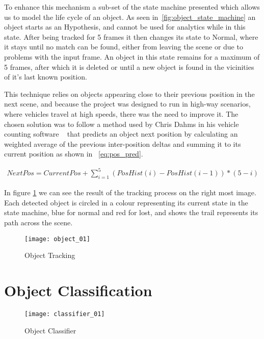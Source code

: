 To enhance this mechanism a sub-set of the state machine presented  which allows us to model the life cycle of an object. As seen in~\ref{fig:object_state_machine} an object starts as an Hypothesis, and cannot be used for analytics while in this state. After being tracked for 5 frames it then changes its state to Normal, where it stays until no match can be found, either from leaving the scene or due to problems with the input frame. An object in this state remains for a maximum of 5 frames, after which it is deleted or until a new object is found in the vicinities of it's last known position.

This technique relies on objects appearing close to their previous position in the next scene, and because the project was designed to run in high-way scenarios, where vehicles travel at high speeds, there was the need to improve it. The chosen solution was to follow a method used by Chris Dahms in his vehicle counting software ~\cite{dahms_opencv_3_car_counting_cpp_2017} that predicts an object next position by calculating an weighted average of the previous inter-position deltas and summing it to its current position as shown in ~\ref{eq:pos_pred}.

\begin{eqnarray}
\label{eq:pos_pred}
NextPos = CurrentPos + \sum_{i=1}^{5} (PosHist(i) - PosHist(i-1)) * (5-i)
\end{eqnarray}

In figure \ref{fig:object_tracking} we can see the result of the tracking process on the right most image. Each detected object is circled in a colour representing its current state in the state machine, blue for normal and red for lost, and shows the trail represents its path across the scene. 

\begin{figure}[h]
  \begin{center}
    \leavevmode
    \texttt{[image: object\_01]}
    \caption{Object Tracking}
    \label{fig:object_tracking}
  \end{center}
\end{figure}

\section{Object Classification}

\begin{figure}[h]
  \begin{center}
    \leavevmode
    \texttt{[image: classifier\_01]}
    \caption{Object Classifier}
    \label{fig:object_classifier}
  \end{center}
\end{figure}

